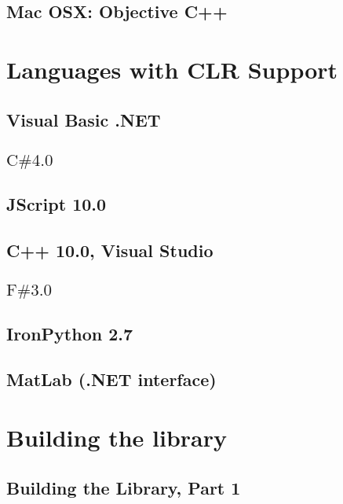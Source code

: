 \documentclass[12pt,a4paper,openany]{book}
\begin{document}
\section{Mac OSX: Objective C++}

\chapter{Languages with CLR Support}

\section{Visual Basic .NET}

\section{\texorpdfstring {$\text {C\# 4.0 } $}{CSharp}}

\section{JScript 10.0}

\section{C++ 10.0, Visual Studio}

\section{\texorpdfstring {$\text {F\# 3.0 } $}{FSharp}}

\section{IronPython 2.7}

\section{MatLab (.NET interface)}

\chapter{Building the library}

\section{Building the Library, Part 1}
\end{document}
